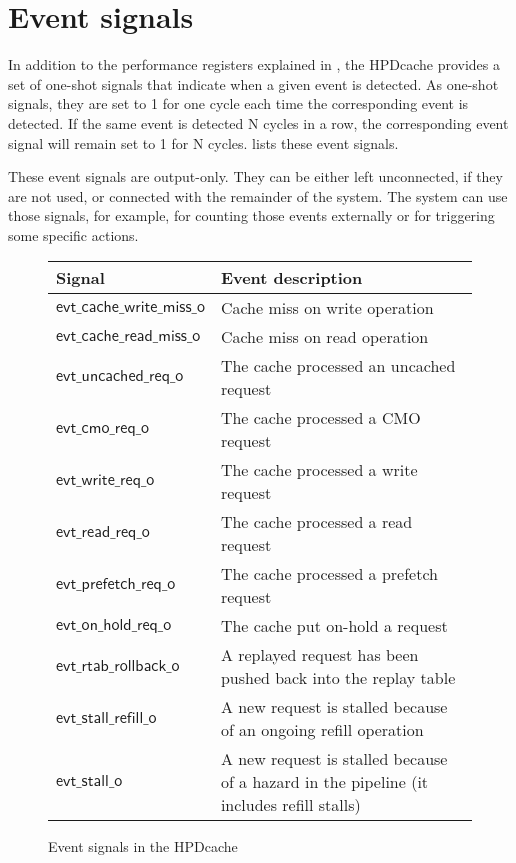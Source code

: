 \documentclass[10pt,titlepage,twoside]{book}
\begin{document}
\section{Event signals}

In addition to the performance registers explained in , the \ac{HPDcache} provides a set of one-shot signals that indicate when a given event is detected.
As one-shot signals, they are set to 1 for one cycle each time the corresponding event is detected.
If the same event is detected N cycles in a row, the corresponding event signal will remain set to 1 for N cycles.
 lists these event signals.

These event signals are output-only.
They can be either left unconnected, if they are not used, or connected with the remainder of the system.
The system can use those signals, for example, for counting those events externally or for triggering some specific actions.

\begin{figure}[!htbp]
  \begin{center}
    \caption{Event signals in the \ac*{HPDcache}}%
    {\footnotesize%
    \begin{tabular}{ll}
      \toprule
      \textbf{Signal}
      & \textbf{Event description} \\
      \midrule
      $\mathsf{evt\_cache\_write\_miss\_o}$
      & Cache miss on write operation\\
      \midrule
      $\mathsf{evt\_cache\_read\_miss\_o}$
      & Cache miss on read operation\\
      \midrule
      $\mathsf{evt\_uncached\_req\_o}$
      & The cache processed an uncached request\\
      \midrule
      $\mathsf{evt\_cmo\_req\_o}$
      & The cache processed a \ac{CMO} request\\
      \midrule
      $\mathsf{evt\_write\_req\_o}$
      & The cache processed a write request\\
      \midrule
      $\mathsf{evt\_read\_req\_o}$
      & The cache processed a read request\\
      \midrule
      $\mathsf{evt\_prefetch\_req\_o}$
      & The cache processed a prefetch request\\
      \midrule
      $\mathsf{evt\_on\_hold\_req\_o}$
      & The cache put on-hold a request\\
      \midrule
      $\mathsf{evt\_rtab\_rollback\_o}$
      & A replayed request has been pushed back into the replay table\\
      \midrule
      $\mathsf{evt\_stall\_refill\_o}$
      & A new request is stalled because of an ongoing refill operation\\
      \midrule
      $\mathsf{evt\_stall\_o}$
      & A new request is stalled because of a hazard in the pipeline (it includes refill stalls)\\
      \bottomrule
  \end{tabular}}
  \end{center}
\end{figure}
\end{document}

